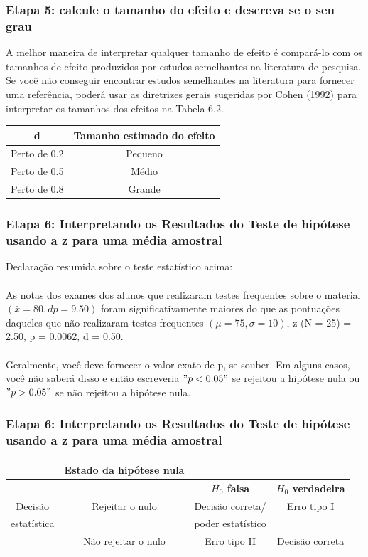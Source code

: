 \documentclass[11pt]{beamer}
\begin{document}
\begin{frame}
\frametitle{Etapa 5: calcule o tamanho do efeito e descreva se o seu grau}
A melhor maneira de interpretar qualquer tamanho de efeito é compará-lo com os tamanhos de efeito produzidos por estudos semelhantes na literatura de pesquisa. Se você não conseguir encontrar estudos semelhantes na literatura para fornecer uma referência, poderá usar as diretrizes gerais sugeridas por Cohen (1992) para interpretar os tamanhos dos efeitos na Tabela 6.2.

\begin{center}
\begin{tabular}{cc} 
 \hline
d  & Tamanho estimado do efeito\\
 \hline
Perto de 0.2 & Pequeno \\
Perto de 0.5 & Médio \\
Perto de 0.8 & Grande \\
 \hline
\end{tabular}
\end{center}   

\end{frame}

\begin{frame}
\frametitle{Etapa 6: Interpretando os Resultados do Teste de hipótese usando a z para uma média amostral}

Declaração resumida sobre o teste estatístico acima:\\~\\
As notas dos exames dos alunos que realizaram testes frequentes sobre o material $(\bar{x} = 80, dp = 9.50)$ foram significativamente maiores do que as pontuações daqueles que não realizaram testes frequentes $(\mu = 75, \sigma = 10)$, z (N = 25) = 2.50, p = 0.0062, d = 0.50.\\~\\

Geralmente, você deve fornecer o valor exato de p, se souber. Em alguns casos, você não saberá disso e então escreveria \("p < 0.05"\) se rejeitou a hipótese nula ou \("p > 0.05"\) se não rejeitou a hipótese nula.
\end{frame}

\begin{frame}
\frametitle{Etapa 6: Interpretando os Resultados do Teste de hipótese usando a z para uma média amostral}

\begin{center}
\begin{tabular}{cccc} 
 \hline
& Estado da hipótese nula &  & \\
 \hline
& & \textbf{$H_0$ falsa} & \textbf{$H_0$ verdadeira}\\
Decisão & Rejeitar o nulo & Decisão correta/ & Erro tipo I \\
estatística &  & poder estatístico &  \\
& Não rejeitar o nulo & Erro tipo II & Decisão correta\\
 \hline
\end{tabular}
\end{center}

\end{frame}
\end{document}

